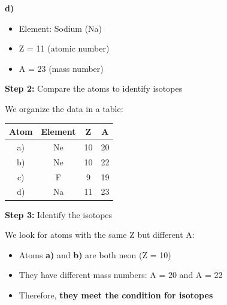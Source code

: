 \begin{exercise}
\begin{solu}
        \textbf{d) }
        \begin{itemize}
            \item Element: Sodium (Na)
            \item Z = 11 (atomic number)
            \item A = 23 (mass number)
        \end{itemize}

        \textbf{Step 2:} Compare the atoms to identify isotopes

        We organize the data in a table:

        \begin{center}
            \begin{tabular}{@{}cccc@{}}
                \toprule
                \textbf{Atom} & \textbf{Element} & \textbf{Z} & \textbf{A} \\
                \midrule
                a) & Ne & 10 & 20 \\[3pt]
                b) & Ne & 10 & 22 \\[3pt]
                c) & F & 9 & 19 \\[3pt]
                d) & Na & 11 & 23 \\
                \bottomrule
            \end{tabular}
        \end{center}

        \textbf{Step 3:} Identify the isotopes

        We look for atoms with the same Z but different A:
        \begin{itemize}
            \item Atoms \textbf{a)} and \textbf{b)} are both neon (Z = 10)
            \item They have different mass numbers: A = 20 and A = 22
            \item Therefore, \textbf{they meet the condition for isotopes}
        \end{itemize}


\end{solu}
\end{exercise}
